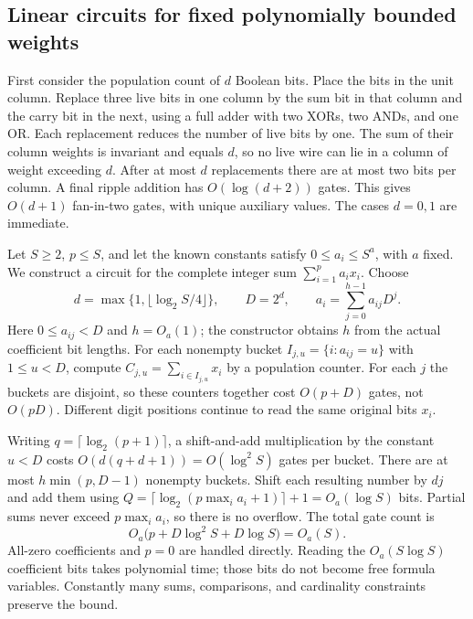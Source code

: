 \subsection{Linear circuits for fixed polynomially bounded weights}
\label{sec:lean-arithmetic}

First consider the population count of $d$ Boolean bits. Place the
bits in the unit column. Replace three live bits in one column by the
sum bit in that column and the carry bit in the next, using a full
adder with two XORs, two ANDs, and one OR. Each replacement reduces
the number of live bits by one. The sum of their column weights is
invariant and equals $d$, so no live wire can lie in a column of
weight exceeding $d$. After at most $d$ replacements there are at
most two bits per column. A final ripple addition has
$O(\log(d+2))$ gates. This gives $O(d+1)$ fan-in-two gates, with
unique auxiliary values. The cases $d=0,1$ are immediate.

Let $S\ge2$, $p\le S$, and let the known constants satisfy
$0\le a_i\le S^a$, with $a$ fixed. We construct a circuit for the
complete integer sum $\sum_{i=1}^p a_ix_i$. Choose
\[
 d=\max\{1,\lfloor\log_2 S/4\rfloor\},\qquad D=2^d,
 \qquad a_i=\sum_{j=0}^{h-1}a_{ij}D^j.
\]
Here $0\le a_{ij}<D$ and $h=O_a(1)$; the constructor obtains $h$
from the actual coefficient bit lengths. For each nonempty bucket
$I_{j,u}=\{i:a_{ij}=u\}$ with $1\le u<D$, compute
$C_{j,u}=\sum_{i\in I_{j,u}}x_i$ by a population counter.
For each $j$ the buckets are disjoint, so these counters together
cost $O(p+D)$ gates, not $O(pD)$. Different digit positions continue
to read the same original bits $x_i$.

Writing $q=\lceil\log_2(p+1)\rceil$, a shift-and-add multiplication
by the constant $u<D$ costs $O(d(q+d+1))=O(\log^2 S)$ gates per
bucket. There are at most $h\min(p,D-1)$ nonempty buckets. Shift
each resulting number by $dj$ and add them using
$Q=\lceil\log_2(p\max_i a_i+1)\rceil+1=O_a(\log S)$ bits.
Partial sums never exceed $p\max_i a_i$, so there is no overflow.
The total gate count is
\begin{equation}\label{eq:lean-weight-size}
 O_a\bigl(p+D\log^2 S+D\log S\bigr)=O_a(S).
\end{equation}
All-zero coefficients and $p=0$ are handled directly. Reading the
$O_a(S\log S)$ coefficient bits takes polynomial time; those bits
do not become free formula variables. Constantly many sums,
comparisons, and cardinality constraints preserve the bound.

